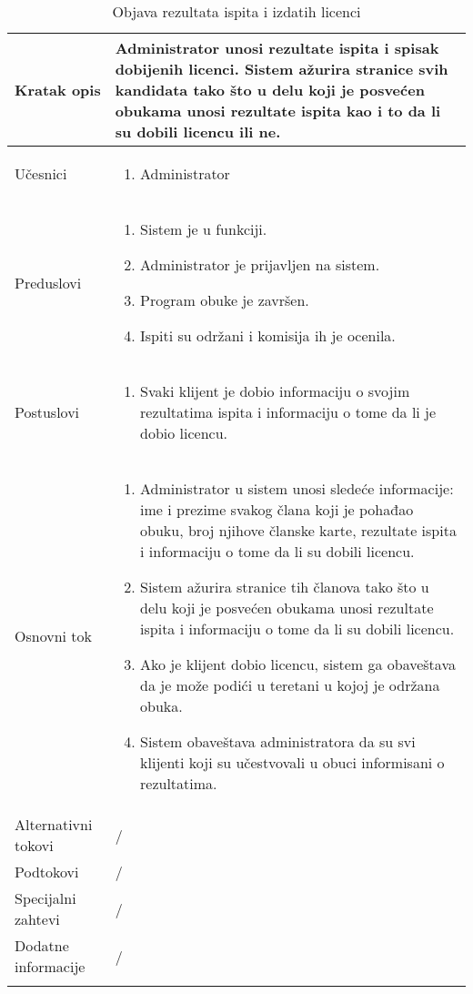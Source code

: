 \documentclass[../../main.tex]{subfiles}
\begin{document}
\begin{longtable}{| p{} | p{} |} 
\hline
    Kratak opis & Administrator unosi rezultate ispita i spisak dobijenih licenci. Sistem ažurira stranice svih kandidata tako što u delu koji je posvećen obukama unosi rezultate ispita kao i to da li su dobili licencu ili ne. \\ 
\hline    
    Učesnici &
    \begin{enumerate}
        \item Administrator
    \end{enumerate}\\
\hline
   Preduslovi &
   \begin{enumerate}
        \item Sistem je u funkciji.
        \item Administrator je prijavljen na sistem.
        \item Program obuke je završen.
        \item Ispiti su održani i komisija ih je ocenila.
    \end{enumerate}\\
\hline  
    Postuslovi & 
    \begin{enumerate}
        \item Svaki klijent je dobio informaciju o svojim rezultatima ispita i informaciju o tome da li je dobio licencu.
    \end{enumerate} \\
\hline
    Osnovni tok & 
    \begin{enumerate}
        \item Administrator u sistem unosi sledeće informacije: ime i prezime svakog člana koji je pohađao obuku, broj njihove članske karte, rezultate ispita i informaciju o tome da li su dobili licencu.
        \item Sistem ažurira stranice tih članova tako što u delu koji je posvećen obukama unosi rezultate ispita i informaciju o tome da li su dobili licencu.
        \item Ako je klijent dobio licencu, sistem ga obaveštava da je može podići u teretani u kojoj je održana obuka.
        \item Sistem obaveštava administratora da su svi klijenti koji su učestvovali u obuci informisani o rezultatima.
    \end{enumerate}\\
\hline
    Alternativni tokovi & / \\
\hline
    Podtokovi & /\\
\hline
    Specijalni zahtevi & /\\
\hline
    Dodatne informacije & /\\
\hline
\caption{Objava rezultata ispita i izdatih licenci}
\end{longtable}
\end{document}
